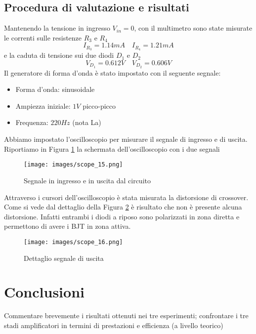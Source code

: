 \subsection{Procedura di valutazione e risultati}
Mantenendo la tensione in ingresso $V_{in}=0$, con il multimetro sono state misurate le correnti sulle resistenze $R_3$ e $R_4$
\begin{equation*}
    I_{R_3}=1.14mA\quad I_{R_4}=1.21mA
\end{equation*}
e la caduta di tensione sui due diodi $D_1$ e $D_2$
\begin{equation*}
    V_{D_1}=0.612V\quad V_{D_2}=0.606V
\end{equation*}
\clearpage 
Il generatore di forma d'onda è stato impostato con il seguente segnale:
\begin{itemize}
    \item Forma d'onda: sinusoidale
    \item Ampiezza iniziale: $1V$ picco-picco
    \item Frequenza: $220Hz$ (nota La)
\end{itemize}
Abbiamo impostato l'oscilloscopio per misurare il segnale di ingresso e di uscita. Riportiamo in Figura \ref{fig:scope_15} la schermata dell'oscilloscopio con i due segnali
\begin{figure}[H]
    \centering
    \texttt{[image: images/scope\_15.png]}
    \caption{Segnale in ingresso e in uscita dal circuito}
    \label{fig:scope_15}
\end{figure}
Attraverso i cursori dell'oscilloscopio è stata misurata la distorsione di crossover. Come si vede dal dettaglio della Figura \ref{fig:scope_16} è risultato che non è presente alcuna distorsione. Infatti entrambi i diodi a riposo sono polarizzati in zona diretta e permettono di avere i BJT in zona attiva.
\begin{figure}[H]
    \centering
    \texttt{[image: images/scope\_16.png]}
    \caption{Dettaglio segnale di uscita}
    \label{fig:scope_16}
\end{figure}
\section{Conclusioni}
Commentare brevemente i risultati ottenuti nei tre esperimenti; confrontare i tre stadi amplificatori in termini di prestazioni e efficienza (a livello teorico)